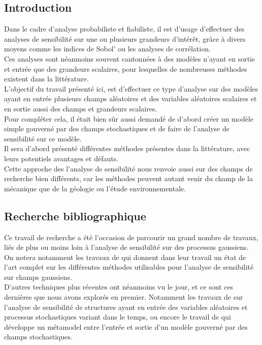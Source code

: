 \documentclass[a4paper,10pt]{article}
\begin{document}
\subsection{Introduction}
Dans le cadre d'analyse probabiliste et fiabiliste, il est d'usage d’effectuer des analyses de sensibilité sur une ou plusieurs grandeurs d’intérêt, grâce à divers moyens comme les indices de Sobol' ou les analyses de corrélation. \\
Ces analyses sont néanmoins souvent cantonnées à des modèles n'ayant en sortie et entrée que des grandeurs scalaires, pour lesquelles de nombreuses méthodes existent dans la littérature.\\
L'objectif du travail présenté ici, est d’effectuer ce type d'analyse sur des modèles ayant en entrée plusieurs champs aléatoires et des variables aléatoires scalaires et en sortie aussi des champs et grandeurs scalaires. \\ Pour compléter cela, il était bien sûr aussi demandé de d'abord créer un modèle simple gouverné par des champs stochastiques et de faire de l'analyse de sensibilité sur ce modèle. \\
Il sera d'abord présenté différentes méthodes présentes dans la littérature, avec leurs potentiels avantages et défauts. \\ 
Cette approche des l'analyse de sensibilité nous renvoie aussi sur des champs de recherche bien différents, car les méthodes peuvent autant venir du champ de la mécanique que de la géologie ou l'étude environnementale.

 
\subsection{Recherche bibliographique}
Ce travail de recherche a été l'occasion de parcourir un grand nombre de travaux, liés de plus ou moins loin à l'analyse de sensibilité sur des processus gaussiens.\\
On notera notamment les travaux de \cite{Lilburne2009Feb} qui donnent dans leur travail un état de l'art complet sur les différentes méthodes utilisables pour l'analyse de sensibilité sur champs gaussiens. \\
D'autres techniques plus récentes ont néanmoins vu le jour, et ce sont ces dernières que nous avons explorés en premier. Notamment les travaux de \cite{Wei2017May} sur l'analyse de sensibilité de structures ayant en entrée des variables aléatoires et processus stochastiques variant dans le temps, ou encore le travail de \cite{Pronzato2019Jul} qui développe un métamodel entre l'entrée et sortie d'un modèle gouverné par des champs stochastiques.
\end{document}
